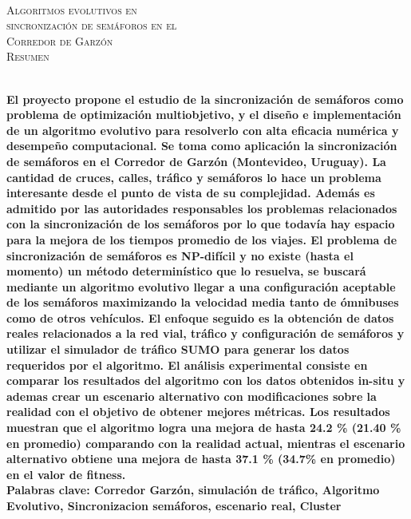 {
\thispagestyle{empty}
~\\[0.2cm]
\begin{center}
    \textsc{\huge Algoritmos evolutivos en  } \\[0.2cm] 
    \textsc{\huge sincronización de semáforos en el  } \\[0.2cm]         
    \textsc{\huge Corredor de Garzón} \\[1cm]
    \textsc{\Large Resumen}
\end{center}
~\\[0.2cm]
\textbf{\large 
El proyecto propone el estudio de la sincronización de semáforos como problema de optimización multiobjetivo, y el diseño e implementación de un algoritmo evolutivo para resolverlo con alta eficacia numérica y desempeño computacional. \newline \newline
Se toma como aplicación la sincronización de semáforos en el Corredor de Garzón  (Montevideo, Uruguay). La cantidad de cruces, calles, tráfico y semáforos lo hace un problema interesante desde el punto de vista de su complejidad. Además es admitido por las autoridades responsables los problemas relacionados con la sincronización de los semáforos por lo que todavía hay espacio para la mejora de los tiempos promedio de los viajes.  \newline \newline
El problema de sincronización de semáforos es NP-difícil y no existe (hasta el momento) un método determinístico que lo resuelva, se buscará mediante un algoritmo evolutivo llegar a una configuración aceptable de los semáforos maximizando la velocidad media tanto de ómnibuses como de otros vehículos.
El enfoque seguido es la obtención de datos reales relacionados a la red vial, tráfico y configuración de semáforos y utilizar el simulador de tráfico SUMO para generar los datos requeridos por el algoritmo.
El análisis experimental consiste en comparar los resultados del algoritmo con los datos obtenidos in-situ y ademas crear un escenario alternativo con modificaciones sobre la realidad con el objetivo de obtener mejores métricas. Los resultados muestran que el algoritmo logra una mejora de hasta  24.2 \% (21.40 \% en promedio)  comparando con la realidad actual, mientras el escenario alternativo obtiene una mejora de hasta 37.1 \% (34.7\% en promedio) en el valor de fitness.
 } 	
	~\\[1.0cm]
    \textbf{\large Palabras clave: Corredor Garzón, simulación de tráfico,  Algoritmo Evolutivo, Sincronizacion semáforos, escenario real, Cluster}

}
\cleardoublepage
